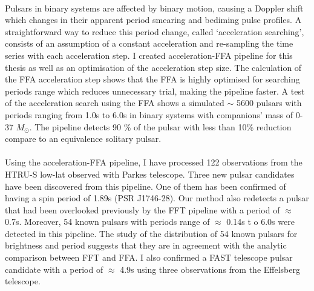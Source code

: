 \documentclass[../chapter1/thesis_msc.tex]{subfiles}
\begin{document}
\paragraph{} Pulsars in binary systems are affected by binary motion, causing a Doppler shift which changes in their apparent period smearing and bediming pulse profiles. 
A straightforward way to reduce this period change, called `acceleration searching', consists of an assumption of a constant acceleration and re-sampling the time series with each acceleration step. I created acceleration-FFA pipeline for this thesis as well as an optimisation of the acceleration step size. The calculation of the FFA acceleration step shows that the FFA is highly optimised for searching periods range which reduces unnecessary trial, making the pipeline faster. A test of the acceleration search using the FFA shows a simulated $\sim$ 5600 pulsars with periods ranging from 1.0s to 6.0s in binary systems with companions' mass of 0-37 $M_\odot$. The pipeline detects  90 \% of the pulsar with less than 10\% reduction  compare to an equivalence solitary pulsar.  

\paragraph{} Using the acceleration-FFA pipeline, I have processed 122 observations from the HTRU-S low-lat observed with Parkes telescope.
Three new pulsar candidates have been discovered from this pipeline. One of them has been confirmed of having a spin period of 1.89s (PSR J1746-28). 
Our method also redetects a pulsar that had been overlooked previously by the FFT pipeline with a period of $\approx$ 0.7s. Moreover, 54 known pulsars with periods range of $\approx$ 0.14s t o 6.0s were detected in this pipeline. The study of the distribution of 54 known pulsars for brightness and period suggests that they are in agreement with the analytic comparison between FFT and FFA. I also confirmed a FAST telescope pulsar candidate with a period of $\approx$ 4.9s using three observations from the Effelsberg telescope. 
    
    \clearpage
    \thispagestyle{empty}
\end{document}
